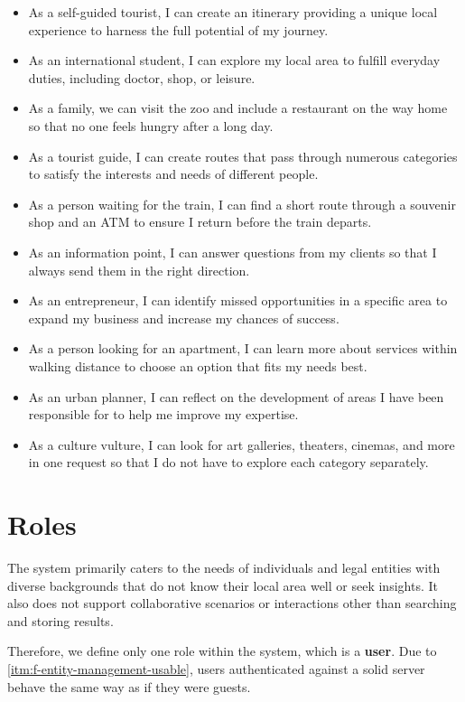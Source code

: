 \begin{itemize}
\item As a self-guided tourist, I can create an itinerary providing a unique local experience to harness the full potential of my journey.
\item As an international student, I can explore my local area to fulfill everyday duties, including doctor, shop, or leisure.
\item As a family, we can visit the zoo and include a restaurant on the way home so that no one feels hungry after a long day.
\item As a tourist guide, I can create routes that pass through numerous categories to satisfy the interests and needs of different people.
\item As a person waiting for the train, I can find a short route through a souvenir shop and an ATM to ensure I return before the train departs.
\item As an information point, I can answer questions from my clients so that I always send them in the right direction.
\item As an entrepreneur, I can identify missed opportunities in a specific area to expand my business and increase my chances of success.
\item As a person looking for an apartment, I can learn more about services within walking distance to choose an option that fits my needs best.
\item As an urban planner, I can reflect on the development of areas I have been responsible for to help me improve my expertise.
\item As a culture vulture, I can look for art galleries, theaters, cinemas, and more in one request so that I do not have to explore each category separately.
\end{itemize}

\section{Roles}\label{sec:roles}

The system primarily caters to the needs of individuals and legal entities with diverse backgrounds that do not know their local area well or seek insights. It also does not support collaborative scenarios or interactions other than searching and storing results.

Therefore, we define only one role within the system, which is a \textbf{user}. Due to \ref{itm:f-entity-management-usable}, users authenticated against a \acs{solid} server behave the same way as if they were guests.

